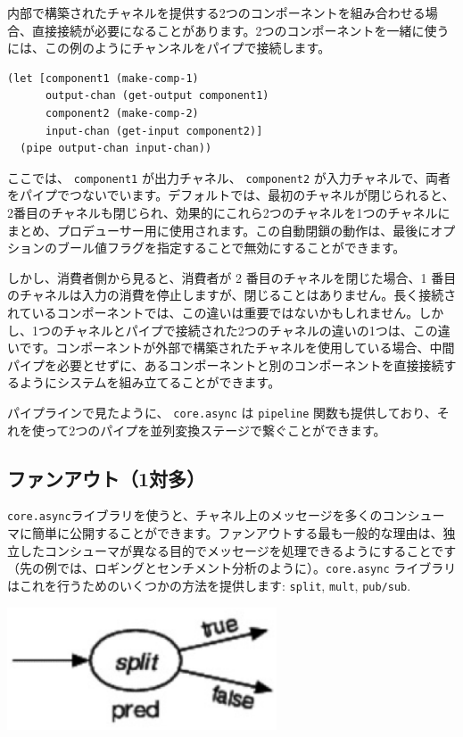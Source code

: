 内部で構築されたチャネルを提供する2つのコンポーネントを組み合わせる場合、直接接続が必要になることがあります。2つのコンポーネントを一緒に使うには、この例のようにチャンネルをパイプで接続します。


\begin{lstlisting}[numbers=none]
(let [component1 (make-comp-1)
      output-chan (get-output component1)
      component2 (make-comp-2)
      input-chan (get-input component2)]
  (pipe output-chan input-chan))
\end{lstlisting}

ここでは、 \texttt{component1} が出力チャネル、 \texttt{component2} が入力チャネルで、両者をパイプでつないでいます。デフォルトでは、最初のチャネルが閉じられると、2番目のチャネルも閉じられ、効果的にこれら2つのチャネルを1つのチャネルにまとめ、プロデューサー用に使用されます。この自動閉鎖の動作は、最後にオプションのブール値フラグを指定することで無効にすることができます。

しかし、消費者側から見ると、消費者が 2 番目のチャネルを閉じた場合、1 番目のチャネルは入力の消費を停止しますが、閉じることはありません。長く接続されているコンポーネントでは、この違いは重要ではないかもしれません。しかし、1つのチャネルとパイプで接続された2つのチャネルの違いの1つは、この違いです。コンポーネントが外部で構築されたチャネルを使用している場合、中間パイプを必要とせずに、あるコンポーネントと別のコンポーネントを直接接続するようにシステムを組み立てることができます。

パイプラインで見たように、 \texttt{core.async} は \texttt{pipeline} 関数も提供しており、それを使って2つのパイプを並列変換ステージで繋ぐことができます。

\subsection{ファンアウト（1対多）}

\texttt{core.async}ライブラリを使うと、チャネル上のメッセージを多くのコンシューマに簡単に公開することができます。ファンアウトする最も一般的な理由は、独立したコンシューマが異なる目的でメッセージを処理できるようにすることです（先の例では、ロギングとセンチメント分析のように）。\texttt{core.async} ライブラリはこれを行うためのいくつかの方法を提供します: \texttt{split}, \texttt{mult}, \texttt{pub/sub}.


\includegraphics[width=8cm]{fig_06_003.eps}


